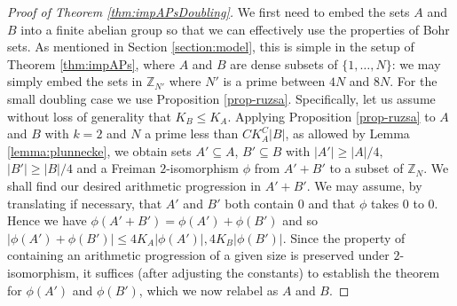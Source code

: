 \documentclass[12pt,a4paper,reqno]{amsart}
\numberwithin{equation}{section}
\theoremstyle{plain}
\theoremstyle{definition}
\renewcommand{\leq}{\leqslant}
\renewcommand{\geq}{\geqslant}
\renewcommand{\subset}{\subseteq}
\def\Z{\mathbb{Z}}
\newcommand{\Zmod}[1]{\Z_{#1}} %
\providecommand{\abs}[1]{\lvert#1\rvert}
\theoremstyle{plain}
\begin{document}
\begin{proof}[Proof of Theorem \ref{thm:impAPsDoubling}]
We first need to embed the sets $A$ and $B$ into a finite abelian group so that we can effectively use the properties of Bohr sets. As mentioned in Section \ref{section:model}, this is simple in the setup of Theorem \ref{thm:impAPs}, where $A$ and $B$ are dense subsets of $\{1,\ldots,N\}$: we may simply embed the sets in $\Zmod{N'}$ where $N'$ is a prime between $4N$ and $8N$. For the small doubling case we use Proposition \ref{prop-ruzsa}. Specifically, let us assume without loss of generality that $K_B \leq K_A$. Applying Proposition \ref{prop-ruzsa} to $A$ and $B$ with $k=2$ and $N$ a prime less than $CK_A^C \abs{B}$, as allowed by Lemma \ref{lemma:plunnecke}, we obtain sets $A' \subset A$, $B' \subset B$ with $\abs{A'} \geq \abs{A}/4,$ $\abs{B'} \geq \abs{B}/4$ and a Freiman $2$-isomorphism $\phi$ from $A'+B'$ to a subset of $\Zmod{N}$. We shall find our desired arithmetic progression in $A'+B'$. We may assume, by translating if necessary, that $A'$ and $B'$ both contain $0$ and that $\phi$ takes $0$ to $0$. Hence we have $\phi(A'+B') = \phi(A') + \phi(B')$ and so $\abs{\phi(A') + \phi(B')} \leq 4K_A\abs{\phi(A')}, 4K_B\abs{\phi(B')}$. Since the property of containing an arithmetic progression of a given size is preserved under $2$-isomorphism, it suffices (after adjusting the constants) to establish the theorem for $\phi(A')$ and $\phi(B')$, which we now relabel as $A$ and $B$.


\end{proof}
\end{document}
